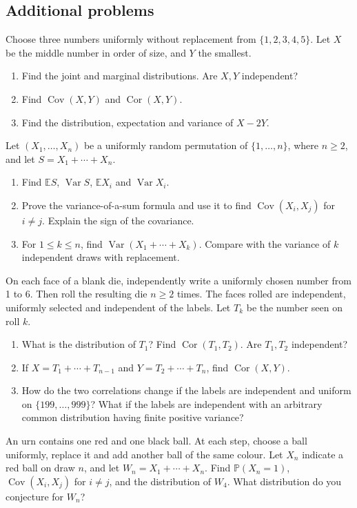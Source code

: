 \documentclass[11pt,a4paper]{article}
\newenvironment{enumeratea}{\begin{enumerate}[label=(\alph*),itemsep=0.28em,topsep=0.25em]}{\end{enumerate}}
\newcommand{\Pbb}{\mathbb P}
\newcommand{\Ebb}{\mathbb E}
\newcommand{\Var}{\operatorname{Var}}
\newcommand{\Cov}{\operatorname{Cov}}
\newcommand{\Cor}{\operatorname{Cor}}
\newcounter{problem}[section]
\begin{document}
\subsection*{Additional problems}
\begin{problembook}
Choose three numbers uniformly without replacement from $\{1,2,3,4,5\}$.
Let $X$ be the middle number in order of size, and $Y$ the smallest.
\begin{enumeratea}
  \item Find the joint and marginal distributions. Are $X,Y$ independent?
  \item Find $\Cov(X,Y)$ and $\Cor(X,Y)$.
  \item Find the distribution, expectation and variance of $X-2Y$.
\end{enumeratea}
\end{problembook}
\begin{problempencil}
Let $(X_1,\ldots,X_n)$ be a uniformly random permutation of $\{1,\ldots,n\}$,
where $n\ge2$, and let $S=X_1+\cdots+X_n$.
\begin{enumeratea}
  \item Find $\Ebb S$, $\Var S$, $\Ebb X_i$ and $\Var X_i$.
  \item Prove the variance-of-a-sum formula and use it to find $\Cov(X_i,X_j)$
  for $i\ne j$. Explain the sign of the covariance.
  \item For $1\le k\le n$, find $\Var(X_1+\cdots+X_k)$. Compare with the variance
  of $k$ independent draws with replacement.
\end{enumeratea}
\end{problempencil}
\begin{problempencil}
On each face of a blank die, independently write a uniformly chosen number from
1 to 6. Then roll the resulting die $n\ge2$ times. The faces rolled are independent,
uniformly selected and independent of the labels. Let $T_k$ be the number seen on roll $k$.
\begin{enumeratea}
  \item What is the distribution of $T_1$? Find $\Cor(T_1,T_2)$. Are $T_1,T_2$ independent?
  \item If $X=T_1+\cdots+T_{n-1}$ and $Y=T_2+\cdots+T_n$, find $\Cor(X,Y)$.
  \item How do the two correlations change if the labels are independent and uniform
  on $\{199,\ldots,999\}$? What if the labels are independent with an arbitrary
  common distribution having finite positive variance?
\end{enumeratea}
\end{problempencil}
\begin{problem}
An urn contains one red and one black ball. At each step, choose a ball uniformly,
replace it and add another ball of the same colour. Let $X_n$ indicate a red ball
on draw $n$, and let $W_n=X_1+\cdots+X_n$. Find $\Pbb(X_n=1)$, $\Cov(X_i,X_j)$
for $i\ne j$, and the distribution of $W_4$. What distribution do you conjecture for $W_n$?
\end{problem}
\end{document}
